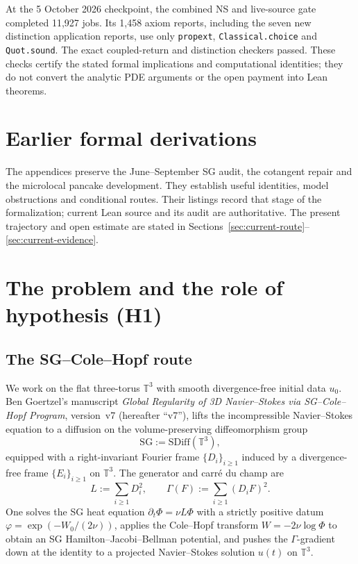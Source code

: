 \documentclass[11pt]{article}
\theoremstyle{definition}
\newcommand{\SDiff}{\mathrm{SDiff}}
\newcommand{\SG}{\mathrm{SG}}
\begin{document}
\endgroup

At the 5 October 2026 checkpoint, the combined NS and live-source gate
completed 11,927 jobs. Its 1,458 axiom reports, including the seven new
distinction application reports, use only \texttt{propext},
\texttt{Classical.choice} and \texttt{Quot.sound}. The exact coupled-return
and distinction checkers passed. These checks certify the stated formal
implications and computational identities; they do not convert the analytic
PDE arguments or the open payment into Lean theorems.

\appendix
\clearpage
\section*{Earlier formal derivations}

The appendices preserve the June--September SG audit, the cotangent repair
and the microlocal pancake development. They establish useful identities,
model obstructions and conditional routes. Their listings record that stage
of the formalization; current Lean source and its audit are authoritative.
The present trajectory and open estimate are stated in
Sections~\ref{sec:current-route}--\ref{sec:current-evidence}.

\section{The problem and the role of hypothesis (H1)}
\label{sec:problem}

\subsection{The SG--Cole--Hopf route}

We work on the flat three-torus $\mathbb{T}^3$ with smooth divergence-free
initial data $u_0$. Ben Goertzel's manuscript \emph{Global Regularity of 3D
Navier--Stokes via SG--Cole--Hopf Program}, version~v7 (hereafter ``v7''), lifts
the incompressible Navier--Stokes equation to a diffusion on the
volume-preserving diffeomorphism group
\[
  \SG := \SDiff(\mathbb{T}^3),
\]
equipped with a right-invariant Fourier frame $\{D_i\}_{i\ge 1}$ induced by a
divergence-free frame $\{E_i\}_{i\ge 1}$ on $\mathbb{T}^3$. The generator and
carré du champ are
\[
  L := \sum_{i\ge 1} D_i^2,
  \qquad
  \Gamma(F) := \sum_{i\ge 1} (D_i F)^2 .
\]
One solves the SG heat equation $\partial_t \Phi = \nu L\Phi$ with a strictly
positive datum $\varphi = \exp(-W_0/(2\nu))$, applies the Cole--Hopf transform
$W = -2\nu \log \Phi$ to obtain an SG Hamilton--Jacobi--Bellman potential, and
pushes the $\Gamma$-gradient down at the identity to a projected
Navier--Stokes solution $u(t)$ on $\mathbb{T}^3$.
\end{document}
